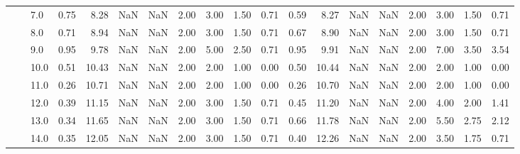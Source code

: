 \begin{tabular}{lllrrrrrrrrrrrrrrrr}
       &     & 7.0  &      0.75 &       8.28 &               NaN &                NaN & 2.00 &   3.00 &             1.50 &                         0.71 &      0.59 &       8.27 &               NaN &                NaN & 2.00 &   3.00 &             1.50 &                         0.71 \\
       &     & 8.0  &      0.71 &       8.94 &               NaN &                NaN & 2.00 &   3.00 &             1.50 &                         0.71 &      0.67 &       8.90 &               NaN &                NaN & 2.00 &   3.00 &             1.50 &                         0.71 \\
       &     & 9.0  &      0.95 &       9.78 &               NaN &                NaN & 2.00 &   5.00 &             2.50 &                         0.71 &      0.95 &       9.91 &               NaN &                NaN & 2.00 &   7.00 &             3.50 &                         3.54 \\
       &     & 10.0 &      0.51 &      10.43 &               NaN &                NaN & 2.00 &   2.00 &             1.00 &                         0.00 &      0.50 &      10.44 &               NaN &                NaN & 2.00 &   2.00 &             1.00 &                         0.00 \\
       &     & 11.0 &      0.26 &      10.71 &               NaN &                NaN & 2.00 &   2.00 &             1.00 &                         0.00 &      0.26 &      10.70 &               NaN &                NaN & 2.00 &   2.00 &             1.00 &                         0.00 \\
       &     & 12.0 &      0.39 &      11.15 &               NaN &                NaN & 2.00 &   3.00 &             1.50 &                         0.71 &      0.45 &      11.20 &               NaN &                NaN & 2.00 &   4.00 &             2.00 &                         1.41 \\
       &     & 13.0 &      0.34 &      11.65 &               NaN &                NaN & 2.00 &   3.00 &             1.50 &                         0.71 &      0.66 &      11.78 &               NaN &                NaN & 2.00 &   5.50 &             2.75 &                         2.12 \\
       &     & 14.0 &      0.35 &      12.05 &               NaN &                NaN & 2.00 &   3.00 &             1.50 &                         0.71 &      0.40 &      12.26 &               NaN &                NaN & 2.00 &   3.50 &             1.75 &                         0.71 \\

\end{tabular}
